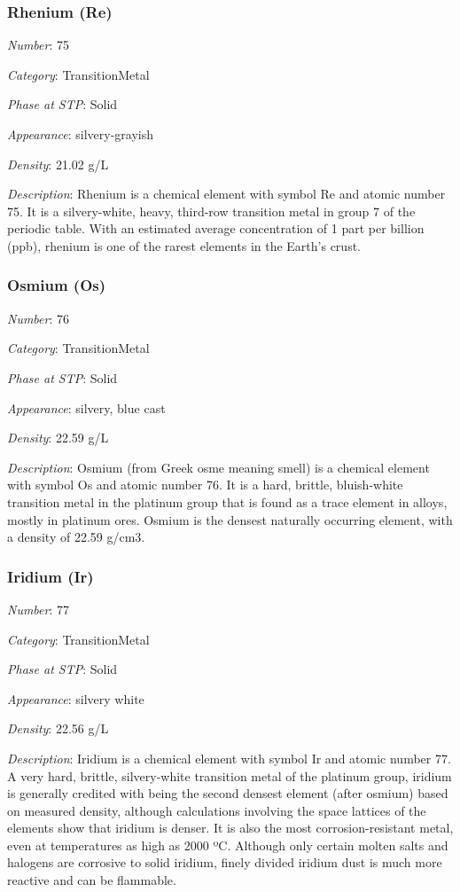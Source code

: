 \documentclass{article}
\begin{document}
\hypertarget{subsubsection::Re}{}\subsubsection{Rhenium (Re)}

\textit{Number}: 75

\textit{Category}: TransitionMetal

\textit{Phase at STP}: Solid

\textit{Appearance}: silvery-grayish

\textit{Density}: 21.02 g/L

\textit{Description}: Rhenium is a chemical element with symbol Re and atomic number 75. It is a silvery-white, heavy, third-row transition metal in group 7 of the periodic table. With an estimated average concentration of 1 part per billion (ppb), rhenium is one of the rarest elements in the Earth's crust.

\hypertarget{subsubsection::Os}{}\subsubsection{Osmium (Os)}

\textit{Number}: 76

\textit{Category}: TransitionMetal

\textit{Phase at STP}: Solid

\textit{Appearance}: silvery, blue cast

\textit{Density}: 22.59 g/L

\textit{Description}: Osmium (from Greek osme meaning smell) is a chemical element with symbol Os and atomic number 76. It is a hard, brittle, bluish-white transition metal in the platinum group that is found as a trace element in alloys, mostly in platinum ores. Osmium is the densest naturally occurring element, with a density of 22.59 g/cm3.

\hypertarget{subsubsection::Ir}{}\subsubsection{Iridium (Ir)}

\textit{Number}: 77

\textit{Category}: TransitionMetal

\textit{Phase at STP}: Solid

\textit{Appearance}: silvery white

\textit{Density}: 22.56 g/L

\textit{Description}: Iridium is a chemical element with symbol Ir and atomic number 77. A very hard, brittle, silvery-white transition metal of the platinum group, iridium is generally credited with being the second densest element (after osmium) based on measured density, although calculations involving the space lattices of the elements show that iridium is denser. It is also the most corrosion-resistant metal, even at temperatures as high as 2000 ºC. Although only certain molten salts and halogens are corrosive to solid iridium, finely divided iridium dust is much more reactive and can be flammable.
\end{document}
